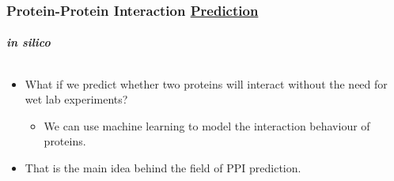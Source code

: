 \begin{frame}[fragile]
  \frametitle{Protein-Protein Interaction \underline{Prediction}}
  \framesubtitle{\textit{in silico}}

  \begin{columns}
    \begin{column}{\textwidth}
      \vspace{-2em}

      \begin{itemize}
        \item<1-> What if we predict whether two proteins will interact without the need for wet lab experiments?
              \begin{itemize}
                \item We can use machine learning to model the interaction behaviour of proteins.
              \end{itemize}
        \item<2-> That is the main idea behind the field of PPI prediction.
      \end{itemize}
    \end{column}

    
  \end{columns}

\end{frame}


